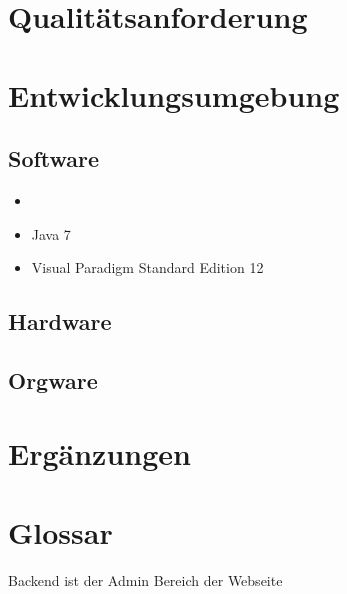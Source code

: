 \documentclass[10pt,a4paper]{article}
\begin{document}
\section{Qualit\"atsanforderung}
\section{Entwicklungsumgebung}
\subsection{Software}
\begin{itemize}
	\item 
	\item Java 7
	\item Visual Paradigm Standard Edition 12
\end{itemize}
\subsection{Hardware}
\subsection{Orgware}
\section{Erg\"anzungen}
\section{Glossar}

Backend ist der Admin Bereich der Webseite
\end{document}
